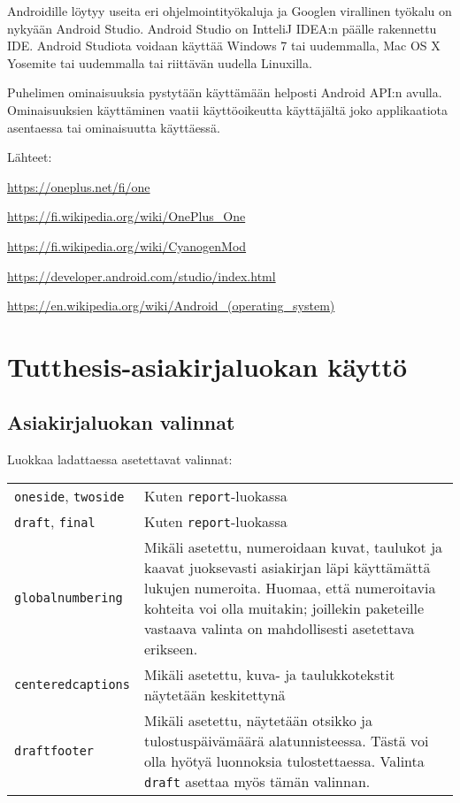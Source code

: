\documentclass[globalnumbering,centeredcaptions,draftfooter]{tutthesis/tutthesis} %
\begin{document}
Androidille löytyy useita eri ohjelmointityökaluja ja Googlen virallinen työkalu on nykyään Android Studio. Android Studio on IntteliJ IDEA:n päälle rakennettu IDE. Android Studiota voidaan käyttää Windows 7 tai uudemmalla, Mac OS X Yosemite tai uudemmalla tai riittävän uudella Linuxilla.

Puhelimen ominaisuuksia pystytään käyttämään helposti Android API:n avulla. Ominaisuuksien käyttäminen vaatii käyttöoikeutta käyttäjältä joko applikaatiota asentaessa tai ominaisuutta käyttäessä.

Lähteet:

\url{https://oneplus.net/fi/one}

\url{https://fi.wikipedia.org/wiki/OnePlus_One}

\url{https://fi.wikipedia.org/wiki/CyanogenMod}

\url{https://developer.android.com/studio/index.html}

\url{https://en.wikipedia.org/wiki/Android_(operating_system)}

\chapter{Tutthesis-asiakirjaluokan käyttö}
\label{ch:classdocumentation}

\section{Asiakirjaluokan valinnat}

Luokkaa ladattaessa asetettavat valinnat:

\begin{tabular}[h]{@{} p{} p{} @{}}
\texttt{oneside}, \texttt{twoside} & Kuten \texttt{report}-luokassa \\
\texttt{draft}, \texttt{final} & Kuten \texttt{report}-luokassa \\
\texttt{globalnumbering} & Mikäli asetettu, numeroidaan kuvat, taulukot ja kaavat juoksevasti asiakirjan läpi käyttämättä lukujen numeroita. Huomaa, että numeroitavia kohteita voi olla muitakin; joillekin paketeille vastaava valinta on mahdollisesti asetettava erikseen. \\
\texttt{centeredcaptions} & Mikäli asetettu, kuva- ja taulukkotekstit näytetään keskitettynä\\
\texttt{draftfooter} & Mikäli asetettu, näytetään otsikko ja tulostuspäivämäärä alatunnisteessa. Tästä voi olla hyötyä luonnoksia tulostettaessa. Valinta \texttt{draft} asettaa myös tämän valinnan.
\end{tabular}
\end{document}
